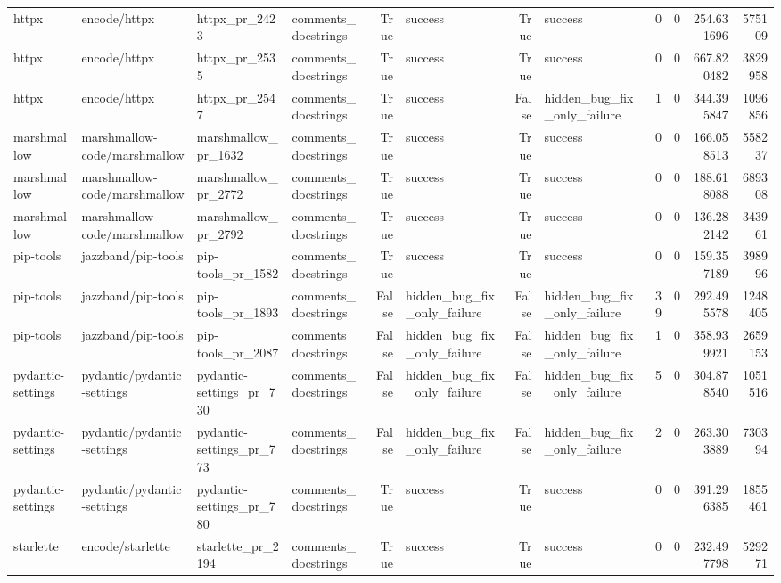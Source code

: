 \begin{tabular}{llllrlrlrrrr}
httpx & encode/httpx & httpx\_pr\_2423 & comments\_docstrings & True & success & True & success & 0 & 0 & 254.631696 & 575109 \\
httpx & encode/httpx & httpx\_pr\_2535 & comments\_docstrings & True & success & True & success & 0 & 0 & 667.820482 & 3829958 \\
httpx & encode/httpx & httpx\_pr\_2547 & comments\_docstrings & True & success & False & hidden\_bug\_fix\_only\_failure & 1 & 0 & 344.395847 & 1096856 \\
marshmallow & marshmallow-code/marshmallow & marshmallow\_pr\_1632 & comments\_docstrings & True & success & True & success & 0 & 0 & 166.058513 & 558237 \\
marshmallow & marshmallow-code/marshmallow & marshmallow\_pr\_2772 & comments\_docstrings & True & success & True & success & 0 & 0 & 188.618088 & 689308 \\
marshmallow & marshmallow-code/marshmallow & marshmallow\_pr\_2792 & comments\_docstrings & True & success & True & success & 0 & 0 & 136.282142 & 343961 \\
pip-tools & jazzband/pip-tools & pip-tools\_pr\_1582 & comments\_docstrings & True & success & True & success & 0 & 0 & 159.357189 & 398996 \\
pip-tools & jazzband/pip-tools & pip-tools\_pr\_1893 & comments\_docstrings & False & hidden\_bug\_fix\_only\_failure & False & hidden\_bug\_fix\_only\_failure & 39 & 0 & 292.495578 & 1248405 \\
pip-tools & jazzband/pip-tools & pip-tools\_pr\_2087 & comments\_docstrings & False & hidden\_bug\_fix\_only\_failure & False & hidden\_bug\_fix\_only\_failure & 1 & 0 & 358.939921 & 2659153 \\
pydantic-settings & pydantic/pydantic-settings & pydantic-settings\_pr\_730 & comments\_docstrings & False & hidden\_bug\_fix\_only\_failure & False & hidden\_bug\_fix\_only\_failure & 5 & 0 & 304.878540 & 1051516 \\
pydantic-settings & pydantic/pydantic-settings & pydantic-settings\_pr\_773 & comments\_docstrings & False & hidden\_bug\_fix\_only\_failure & False & hidden\_bug\_fix\_only\_failure & 2 & 0 & 263.303889 & 730394 \\
pydantic-settings & pydantic/pydantic-settings & pydantic-settings\_pr\_780 & comments\_docstrings & True & success & True & success & 0 & 0 & 391.296385 & 1855461 \\
starlette & encode/starlette & starlette\_pr\_2194 & comments\_docstrings & True & success & True & success & 0 & 0 & 232.497798 & 529271 \\

\end{tabular}
